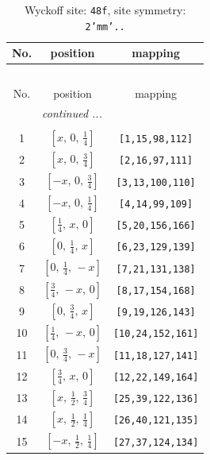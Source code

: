 \documentclass[fleqn,8pt]{jsarticle}
\begin{document}
\begin{longtable}{ccc}
\caption{Wyckoff site: {\tt 48f}, site symmetry: {\tt 2'mm'..}}
 \\
 \hline \hline
No. & position & mapping \\ \hline \endfirsthead

\multicolumn{2}{l}{\tablename\ \thetable{}} \\
 \hline \hline
No. & position & mapping \\ \hline \endhead

 \hline \hline
\multicolumn{2}{r}{\footnotesize\it continued ...} \\ \endfoot

 \hline \hline
\multicolumn{2}{r}{} \\ \endlastfoot

1 & $\left[ x,\, 0,\, \frac{1}{4} \right]$ & {\tt [1,15,98,112]} \\ \hline
2 & $\left[ x,\, 0,\, \frac{3}{4} \right]$ & {\tt [2,16,97,111]} \\ \hline
3 & $\left[ - x,\, 0,\, \frac{3}{4} \right]$ & {\tt [3,13,100,110]} \\ \hline
4 & $\left[ - x,\, 0,\, \frac{1}{4} \right]$ & {\tt [4,14,99,109]} \\ \hline
5 & $\left[ \frac{1}{4},\, x,\, 0 \right]$ & {\tt [5,20,156,166]} \\ \hline
6 & $\left[ 0,\, \frac{1}{4},\, x \right]$ & {\tt [6,23,129,139]} \\ \hline
7 & $\left[ 0,\, \frac{1}{4},\, - x \right]$ & {\tt [7,21,131,138]} \\ \hline
8 & $\left[ \frac{3}{4},\, - x,\, 0 \right]$ & {\tt [8,17,154,168]} \\ \hline
9 & $\left[ 0,\, \frac{3}{4},\, x \right]$ & {\tt [9,19,126,143]} \\ \hline
10 & $\left[ \frac{1}{4},\, - x,\, 0 \right]$ & {\tt [10,24,152,161]} \\ \hline
11 & $\left[ 0,\, \frac{3}{4},\, - x \right]$ & {\tt [11,18,127,141]} \\ \hline
12 & $\left[ \frac{3}{4},\, x,\, 0 \right]$ & {\tt [12,22,149,164]} \\ \hline
13 & $\left[ x,\, \frac{1}{2},\, \frac{3}{4} \right]$ & {\tt [25,39,122,136]} \\ \hline
14 & $\left[ x,\, \frac{1}{2},\, \frac{1}{4} \right]$ & {\tt [26,40,121,135]} \\ \hline
15 & $\left[ - x,\, \frac{1}{2},\, \frac{1}{4} \right]$ & {\tt [27,37,124,134]} \\ \hline

\end{longtable}
\end{document}
